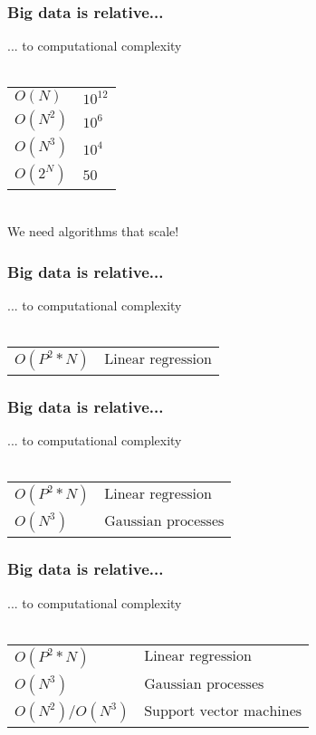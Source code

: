 \documentclass{beamer}
\begin{document}
\begin{frame}
	\frametitle{Big data is relative...}
	\begin{center}
		... to computational complexity\\~\\
		\begin{tabular}{ l l }
			$O(N)$ & $10^{12}$ \\
			$O(N^2) $ & $ 10^{6}$\\
			$O(N^3) $ & $ 10^{4}$\\
			$O(2^N) $ & $ 50$\\				
		\end{tabular}
		\medskip
		\\We need algorithms that scale!
	\end{center}
\end{frame}

\begin{frame}
	\frametitle{Big data is relative...}
	\begin{center}
		... to computational complexity\\~\\
		\begin{tabular}{ l l }
			$O(P^2 * N) $ & $ \text{Linear regression}$\\
		\end{tabular}
	\end{center}
\end{frame}

\begin{frame}
	\frametitle{Big data is relative...}
	\begin{center}
		... to computational complexity\\~\\
		\begin{tabular}{ l l }
			$O(P^2 * N) $ & $ \text{Linear regression}$\\
			$O(N^3) $ & $ \text{Gaussian processes}$\\
		\end{tabular}
	\end{center}
\end{frame}

\begin{frame}
	\frametitle{Big data is relative...}
	\begin{center}
		... to computational complexity\\~\\
		\begin{tabular}{ l l }
			$O(P^2 * N) $ & $ \text{Linear regression}$\\
			$O(N^3) $ & $ \text{Gaussian processes}$\\
			$O(N^2) / O(N^3) $ & $ \text{Support vector machines}$\\
		\end{tabular}
	\end{center}
\end{frame}
\end{document}
